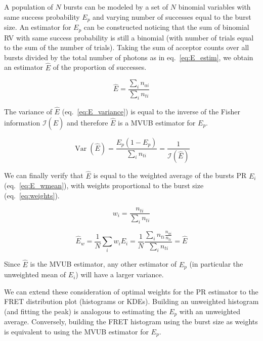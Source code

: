 A population of $N$ bursts can be modeled by a set of $N$ binomial
variables with same success probability $E_p$ and varying number of successes
equal to the burst size. An estimator for $E_p$ can be constructed
noticing that the sum of binomial RV with same 
success probability is still a binomial (with number of trials equal to 
the sum of the number of trials).
Taking the sum of acceptor counts over all bursts divided by the total 
number of photons as in eq.~\ref{eq:E_estim}, we obtain 
an estimator $\hat{E}$ of the proportion of successes.

\begin{equation}
\label{eq:E_estim}
\hat{E} = \frac{\sum_i n_{ai}}{\sum_i n_{ti}}
\end{equation}

The variance of $\hat{E}$ (eq.~\ref{eq:E_variance}) is equal to the inverse of 
the Fisher information $\mathcal{I}(\hat{E})$ and therefore $\hat{E}$ is a MVUB 
estimator for $E_p$.

\begin{equation}
\label{eq:E_variance}
\operatorname{Var}(\hat{E}) = \frac{E_p (1 - E_p)}{\sum_i n_{ti}} = \frac{1}{\mathcal{I}(\hat{E})}
\end{equation}

We can finally verify that $\hat{E}$ is equal to the weighted average of the bursts
PR $E_i$ (eq.~\ref{eq:E_wmean}), with weights proportional to the burst size (eq.~\ref{eq:weights}).

\begin{equation}
\label{eq:weights}
w_i
= \frac{n_{ti}}{\sum_i n_{ti}}
\end{equation}

\begin{equation}
\label{eq:E_wmean}
\hat{E}_w = \frac{1}{N} \sum_i w_i E_i 
= \frac{1}{N} \frac{\sum_i n_{ti} \frac{n_{ai}}{n_{ti}} }{\sum_i n_{ti}} = \hat{E}
\end{equation}

Since $\hat{E}$ is the MVUB estimator, any other estimator of $E_p$ (in particular 
the unweighted mean of $E_i$) will have a larger variance.

We can extend these consideration of optimal weights for 
the PR estimator to the FRET distribution plot (histograms or KDEs). Building an
unweighted histogram (and fitting the peak) is analogous to estimating the 
$E_p$ with an unweighted average. Conversely, building the FRET histogram
using the burst size as weights is equivalent to using
the MVUB estimator for $E_p$.

